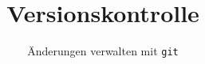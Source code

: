 

\title{Versionskontrolle}
\subtitle[\texttt{git}]{Änderungen verwalten mit \texttt{git}}



\maketitle





